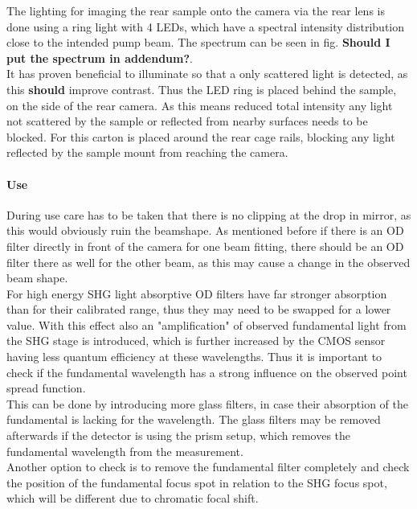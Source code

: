 \documentclass[twoside,openright]{scrreprt}
\begin{document}
The lighting for imaging the rear sample onto the camera via the rear lens is done using a ring light with 4 LEDs, which have a spectral intensity distribution close to the intended pump beam. The spectrum can be seen in fig. \textbf{Should I put the spectrum in addendum?}.\\
It has proven beneficial to illuminate so that a only scattered light is detected, as this \textbf{should} improve contrast. Thus the LED ring is placed behind the sample, on the side of the rear camera. As this means reduced total intensity any light not scattered by the sample or reflected from nearby surfaces needs to be blocked. For this carton is placed around the rear cage rails, blocking any light reflected by the sample mount from reaching the camera.

\paragraph{Use}
During use care has to be taken that there is no clipping at the drop in mirror, as this would obviously ruin the beamshape. As mentioned before if there is an OD filter directly in front of the camera for one beam fitting, there should be an OD filter there as well for the other beam, as this may cause a change in the observed beam shape.\\
For high energy SHG light absorptive OD filters have far stronger absorption than for their calibrated range, thus they may need to be swapped for a lower value. With this effect also an "amplification" of observed fundamental light from the SHG stage is introduced, which is further increased by the CMOS sensor having less quantum efficiency at these wavelengths. Thus it is important to check if the fundamental wavelength has a strong influence on the observed point spread function.\\
This can be done by introducing more glass filters, in case their absorption of the fundamental is lacking for the wavelength. The glass filters may be removed afterwards if the detector is using the prism setup, which removes the fundamental wavelength from the measurement.\\
Another option to check is to remove the fundamental filter completely and check the position of the fundamental focus spot in relation to the SHG focus spot, which will be different due to chromatic focal shift.
\end{document}
